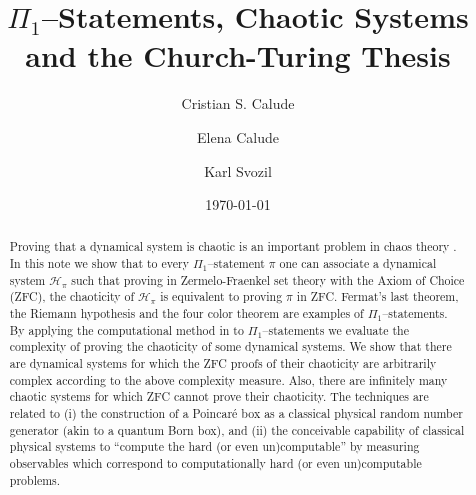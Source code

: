 \documentclass[
aip,
cha,
amssymb
]{revtex4-1}
\begin{document}
\sloppy

\title{$\Pi_{1}$--Statements, Chaotic Systems and the Church-Turing Thesis}


\author{Cristian S. Calude}



\author{Elena Calude}


\author{Karl Svozil}


\date{\today}

\begin{abstract}
Proving that a dynamical system is chaotic is an important problem in chaos theory \cite{1985cfd..book.....F}. In this note we show that to every $\Pi_{1}$--statement $\pi$ one can associate a dynamical system $\mathcal{H}_{\pi}$ such that proving in Zermelo-Fraenkel set theory with the Axiom of Choice (ZFC), the chaoticity of $\mathcal{H}_{\pi}$ is equivalent to proving  $\pi$ in ZFC. Fermat's last theorem, the Riemann hypothesis and the four color theorem are examples of  $\Pi_{1}$--statements. By applying the computational method  in  \cite{calude-elena-dinneen06,calude-elena-ec1,calude-elena-ec2}   to  $\Pi_{1}$--statements we evaluate the complexity of proving the chaoticity of some dynamical systems. We show that there are dynamical systems for which the ZFC proofs of their chaoticity are arbitrarily complex according to the above complexity measure. Also, there are infinitely many chaotic systems for which ZFC cannot prove their chaoticity. The techniques are related to (i) the construction of a Poincar\'e box as a classical physical random number generator (akin to a quantum Born box), and (ii) the conceivable capability of classical physical systems to ``compute the hard (or even un)computable'' by measuring observables which correspond to computationally hard (or even un)computable problems.
\end{abstract}

\maketitle
\end{document}
